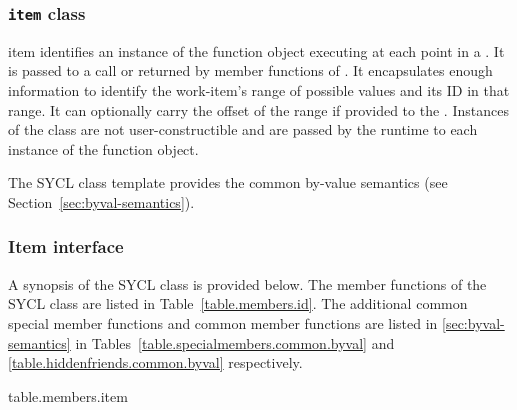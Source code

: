 \subsubsection{\texttt{item} class}
\label{subsec:item.class}

\gls{item} identifies an instance of the function object
executing at each point in a . It is passed to a
 call or returned by member functions of .
It encapsulates enough information to identify the work-item's range
of possible values and its ID in that range. It can optionally carry the offset of the
range if provided to the .
Instances of the  class are
not user-constructible and are passed by the runtime to each instance
of the function object.

The SYCL  class template provides the common by-value semantics
(see Section~\ref{sec:byval-semantics}).

\subsubsection{Item interface}

A synopsis of the SYCL  class is provided below. The member functions of the SYCL  class are listed in Table~\ref{table.members.id}. The additional common special member functions and common member functions are listed in \ref{sec:byval-semantics} in Tables~\ref{table.specialmembers.common.byval} and \ref{table.hiddenfriends.common.byval} respectively.


{table.members.item}

